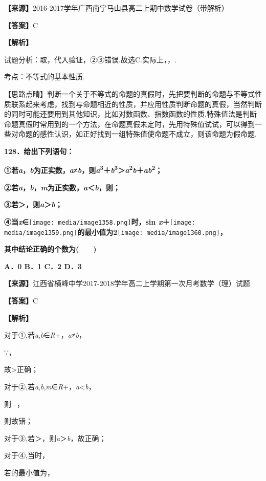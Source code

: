 \textbf{【来源】}2016-2017学年广西南宁马山县高二上期中数学试卷（带解析）

\textbf{【答案】}C

\textbf{【解析】}

试题分析：取，代入验证，②③错误.故选C.实际上，，.

考点：不等式的基本性质.

【思路点晴】判断一个关于不等式的命题的真假时，先把要判断的命题与不等式性质联系起来考虑，找到与命题相近的性质，并应用性质判断命题的真假，当然判断的同时可能还要用到其他知识，比如对数函数、指数函数的性质.特殊值法是判断命题真假时常用到的一个方法，在命题真假未定时，先用特殊值试试，可以得到一些对命题的感性认识，如正好找到一组特殊值使命题不成立，则该命题为假命题.

\textbf{128．给出下列语句：}

\textbf{①若\emph{a}，\emph{b}为正实数，\emph{a}≠\emph{b}，则\emph{a}\textsuperscript{3}＋\emph{b}\textsuperscript{3}＞\emph{a}\textsuperscript{2}\emph{b}＋\emph{ab}\textsuperscript{2}；}

\textbf{②若\emph{a}，\emph{b}，\emph{m}为正实数，\emph{a}＜\emph{b}，则；}

\textbf{③若＞，则\emph{a}＞\emph{b}；}

\textbf{④当\emph{x}∈}\texttt{[image: media/image1358.png]}\textbf{时，sin
\emph{x}＋}\texttt{[image: media/image1359.png]}\textbf{的最小值为2}\texttt{[image: media/image1360.png]}\textbf{，}

\textbf{其中结论正确的个数为(　　)}

\textbf{A．0 B．1 C．2 D．3}

\textbf{【来源】}江西省横峰中学2017-2018学年高二上学期第一次月考数学（理）试题

\textbf{【答案】}C

\textbf{【解析】}

对于①,若\emph{a},\emph{b}∈\emph{R}+，\emph{a}≠\emph{b}，

∵，

故\textgreater 正确；

对于②,若\emph{a},\emph{b},\emph{m}∈\emph{R}+，\emph{a}\textless{}\emph{b}，

则−，

则故错；

对于③,若＞，则\emph{a}＞\emph{b}，故正确；

对于④,当时，

若的最小值为，

